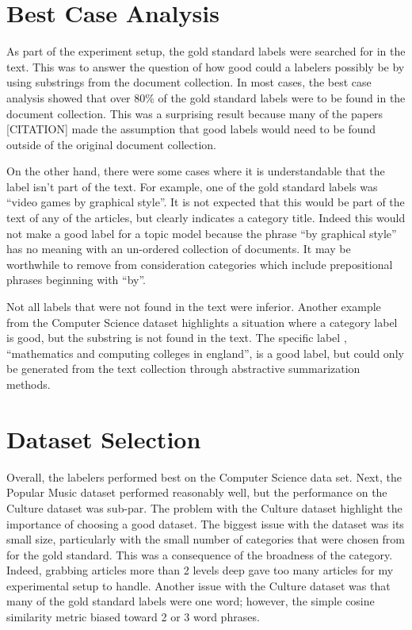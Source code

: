 \section{Best Case Analysis}
As part of the experiment setup, the gold standard labels were searched for in the text.  This was to answer the question of how good could a labelers possibly be by using substrings from the document collection.  In most cases, the best case analysis showed that over 80\% of the gold standard labels were to be found in the document collection.  This was a surprising result because many of the papers [CITATION] made the assumption that good labels would need to be found outside of the original document collection.  

On the other hand, there were some cases where it is understandable that the label isn't part of the text.  For example, one of the gold standard labels was ``video games by graphical style''.  It is not expected that this would be part of the text of any of the articles, but clearly indicates a category title.  Indeed this would not make a good label for a topic model because the phrase ``by graphical style'' has no meaning with an un-ordered collection of documents.  It may be worthwhile to remove from consideration categories which include prepositional phrases beginning with ``by''.

Not all labels that were not found in the text were inferior.  Another example from the Computer Science dataset highlights a situation where a category label is good, but the substring is not found in the text.  The specific label , ``mathematics and computing colleges in england'', is a good label, but could only be generated from the text collection through abstractive summarization methods.

\section{Dataset Selection}

Overall, the labelers performed best on the Computer Science data set.  Next, the Popular Music dataset performed reasonably well, but the performance on the Culture dataset was sub-par.  The problem with the Culture dataset highlight the importance of choosing a good dataset.  The biggest issue with the dataset was its small size, particularly with the small number of categories that were chosen from for the gold standard.  This was a consequence of the broadness of the category.  Indeed, grabbing articles more than 2 levels deep gave too many articles for my experimental setup to handle.  Another issue with the Culture dataset was that many of the gold standard labels were one word; however, the simple cosine similarity metric biased toward 2 or 3 word phrases.

